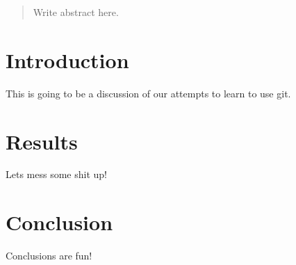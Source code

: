 \documentclass{article}
\begin{document}
\begin{abstract}
Write abstract here.
\end{abstract}

\section{Introduction}

This is going to be a discussion of our attempts to learn to use git.

\section{Results}

Lets mess some shit up!

\section{Conclusion}

Conclusions are fun!
\end{document}
